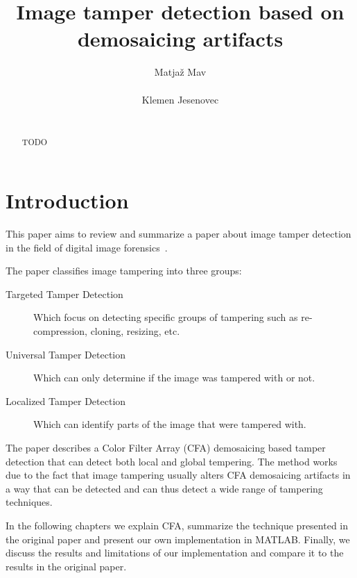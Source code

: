 \documentclass{template/acm_proc_article-sp}
\begin{document}
 

\title{Image tamper detection based on demosaicing artifacts}

\author{
\alignauthor
Matjaž Mav\\
       \\
\alignauthor
Klemen Jesenovec\\
       \\
}

\maketitle
\begin{abstract}
TODO
\end{abstract}


\section{Introduction}
This paper aims to review and summarize a paper about image tamper 
detection in the field of digital image forensics~\cite{dirik2009image}.

The paper classifies image tampering into three groups: 
\begin{description}
    \item[Targeted Tamper Detection] Which focus on detecting specific groups of 
    tampering such as re-compression, cloning, resizing, etc. 
    \item[Universal Tamper Detection] Which can only determine if the image
    was tampered with or not.
    \item[Localized Tamper Detection] Which can identify parts of the image 
    that were tampered with.
\end{description}

The paper describes a Color Filter Array (CFA) demosaicing based tamper detection
that can detect both local and global tempering.
The method works due to the fact that image tampering usually alters CFA demosaicing
artifacts in a way that can be detected and can thus detect a wide range of tampering
techniques. 

In the following chapters we explain CFA, summarize the technique presented 
in the original paper and present our own implementation in MATLAB.
Finally, we discuss the results and limitations of our implementation and compare it
to the results in the original paper.
\end{document}
